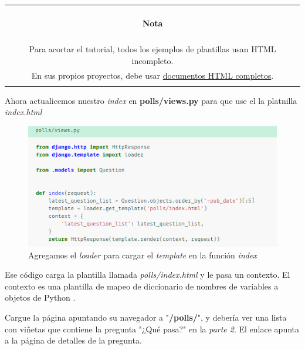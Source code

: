 \documentclass[10pt]{article}
\newcommand{\py}[1]{{\textcolor{B}{Python} #1}}
\begin{document}
\begin{table}[H]
	\begin{tabular}{||c||}
	\hline \\
	\begin{Large}
	\textbf{Nota}
	\end{Large}
	\\\\		
	
Para acortar el tutorial, todos los ejemplos de plantillas usan HTML incompleto.\\ En sus propios proyectos, debe usar {\href{https://developer.mozilla.org/en-US/docs/Learn/HTML/Introduction_to_HTML/Getting_started#Anatomy_of_an_HTML_document}{\textcolor{B}{documentos HTML completos}}}.
\\\\ \hline 	
			\end{tabular}
		\end{table}		

Ahora actualicemos nuestro \textit{index} en \textbf{polls/views.py} para que use el la platnilla \textit{index.html}

\begin{figure}[H]
\begin{center}
\includegraphics[scale=1]{figuras/3/33/333/img3.png}
\caption{Agregamos el \textit{loader} para cargar el \textit{template} en la función \textit{index}}
\end{center}
\end{figure}

Ese código carga la plantilla llamada \textit{polls/index.html} y le pasa un contexto. El contexto es una plantilla de mapeo de diccionario de nombres de variables a objetos de \py{}.


Cargue la página apuntando su navegador a "\textbf{/polls/}", y debería ver una lista con viñetas que contiene la pregunta "¿Qué pasa?" en la \textit{parte 2}. El enlace apunta a la página de detalles de la pregunta.
\end{document}

